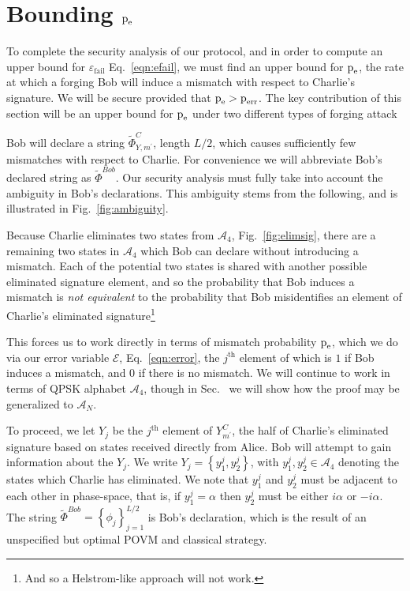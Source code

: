 \section{Bounding $\text{p}_{\text{e}}$}
To complete the security analysis of our protocol, and in order to compute an upper bound for $\varepsilon_{\text{fail}}$ Eq.~\ref{eqn:efail}, we must find an upper bound for $\text{p}_{\text{e}}$, the rate at which a forging Bob will induce a mismatch with respect to Charlie's signature. We will be secure provided that $\text{p}_{\text{e}} > \text{p}_{\text{err}}$. The key contribution of this section will be an upper bound for $\text{p}_{\text{e}}$ under two different types of forging attack




Bob will declare a string $\tilde{\Phi}_{Y, m^\prime}^C$, length $L/2$,  which causes sufficiently few mismatches with respect to Charlie. For convenience we will abbreviate Bob's declared string as $\tilde{\Phi}^{Bob}$. Our security analysis must fully take into account the ambiguity in Bob's declarations. This ambiguity stems from the following, and is illustrated in Fig.~\ref{fig:ambiguity}.

Because Charlie eliminates two states from $\mathcal{A}_4$, Fig.~\ref{fig:elimsig}, there are a remaining two states in $\mathcal{A}_4$ which Bob can declare without introducing a mismatch. Each of the potential two states is shared with another possible eliminated signature element, and so the probability that Bob induces a mismatch is \emph{not equivalent} to the probability that Bob misidentifies an element of Charlie's eliminated signature\footnote{And so a Helstrom-like approach  will not work.}

This forces us to work directly in terms of mismatch probability $\text{p}_{\text{e}}$, which we do via our error variable $\mathcal{E}$, Eq.~\ref{eqn:error}, the $j^{\text{th}}$ element of which is $1$ if Bob induces a mismatch, and $0$ if there is no mismatch. We will continue to work in terms of QPSK alphabet $\mathcal{A}_4$, though in Sec.~ we will show how the proof may be generalized to $\mathcal{A}_N$.

To proceed, we let $Y_j$ be the $j^{\text{th}}$ element of $Y_{m^\prime}^C$, the half of Charlie's eliminated signature based on states received directly from Alice. Bob will attempt to gain information about the $Y_j$. We write $Y_j = \left\{y_1^j, y_2^j\right\}$, with $y_1^j, y_2^j \in \mathcal{A}_4$ denoting the states which Charlie has eliminated. We note that $y_1^j$ and $y_2^j$ must be adjacent to each other in phase-space, that is, if $y_1^j = \alpha$ then $y_2^j$ must be either $i \alpha$ or $- i \alpha$. The string $\tilde{\Phi}^{Bob} = \left\{\phi_j\right\}_{j=1}^{L/2}$ is Bob's declaration, which is the result of an unspecified but optimal POVM and classical strategy.

